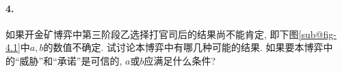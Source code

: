 \documentclass[12pt, a4paper, oneside]{ctexart}
\begin{document}
\paragraph{4.}如果开金矿博弈中第三阶段乙选择打官司后的结果尚不能肯定, 即下图\ref{sub@fig-4.1}中$a,b$的数值不确定. 试讨论本博弈中有哪几种可能的结果. 如果要本博弈中的“威胁”和“承诺”是可信的, $a$或$b$应满足什么条件?
\begin{figure}[htbp]
    \centering
    \subfigure[] {
        \label{fig-4.2}
        \begin{minipage}[b]{.45\linewidth}
            \centering

\end{minipage}}
\end{figure}
\end{document}
